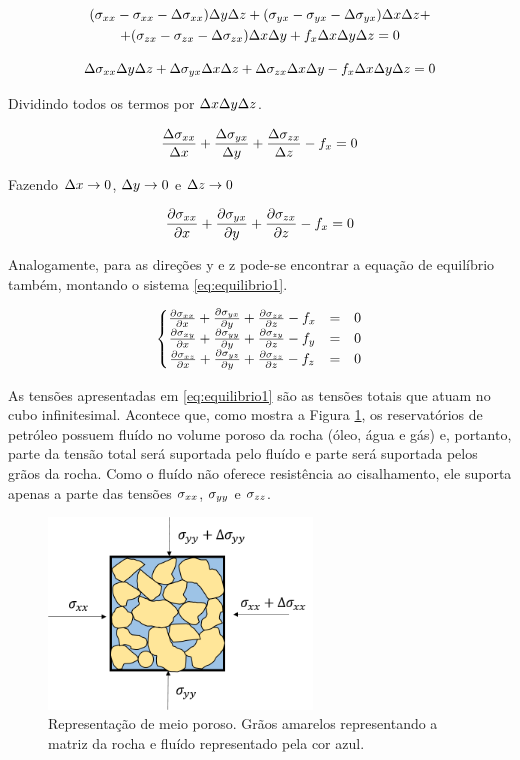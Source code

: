 \begin{multline} \label{eq:equilibrio0}
   (\stxx - \stxx - \Delta \stxx) \Dy\Dz + (\styx - \styx - \Delta \styx)\Dx\Dz  +\\
   + (\stzx - \stzx - \Delta\stzx) \Dx\Dy + f_x\Dx\Dy\Dz = 0
\end{multline}


\begin{equation}
 \Delta \stxx \Dy\Dz + \Delta \styx\Dx\Dz + \Delta\stzx \Dx\Dy - f_x\Dx\Dy\Dz = 0
\end{equation}

Dividindo todos os termos por $\Dx\Dy\Dz$.


\begin{equation}
\frac{ \Delta \stxx }{ \Dx } + \frac{\Delta \styx}{ \Dy } + \frac{\Delta\stzx}{ \Dz } - f_x = 0
\end{equation}

Fazendo $\Dx \rightarrow 0$, $\Dy \rightarrow 0 $ e $\Dz \rightarrow 0$

\begin{equation}
\dx[\stxx] + \dy[\styx] + \dz[\stzx] - f_x = 0
\end{equation}

Analogamente, para as direções y e z pode-se encontrar a equação de equilíbrio também, montando o sistema \eqref{eq:equilibrio1}.

\begin{equation}
\label{eq:equilibrio1}
\left\{\begin{matrix}
 \dx[\stxx] + \dy[\styx] + \dz[\stzx] - f_x & = & 0\\
 \dx[\stxy] + \dy[\styy] + \dz[\stzy] - f_y & = & 0\\
 \dx[\stxz] + \dy[\styz] + \dz[\stzz] - f_z & = & 0
\end{matrix}\right.
\end{equation}


As tensões apresentadas em \eqref{eq:equilibrio1} são as tensões totais que atuam no cubo infinitesimal. Acontece que, como mostra a Figura \ref{fig:rochaComFluido}, os reservatórios de petróleo possuem fluído no volume poroso da rocha (óleo, água e gás) e, portanto, parte da tensão total será suportada pelo fluído e parte será suportada pelos grãos da rocha. Como o fluído não oferece resistência ao cisalhamento, ele suporta apenas a parte das tensões $\stxx$, $\styy$ e $\stzz$.

\begin{figure}[!htbp]
\centering
\includegraphics[width=7cm]{chap01/figs/fluido_rocha_tensoes.png}
\caption{Representação de meio poroso. Grãos amarelos representando a matriz da rocha e fluído representado pela cor azul.}
\label{fig:rochaComFluido}
\end{figure}

